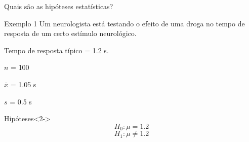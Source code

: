 \documentclass{beamer}
\begin{document}
\begin{frame}{\scriptsize Quais são as hipóteses estatísticas?}
  \begin{exampleblock}{Exemplo 1}
    \tiny
    Um neurologista está testando o efeito de uma droga no tempo de
    resposta de um certo estímulo neurológico.

    \smallskip
    Tempo de resposta típico = \alert{1.2 s}.

    \smallskip
    $n$ = \alert{100}

    $\bar{x}$ = \alert{1.05 s}

    $s$ = \alert{0.5 s}
  \end{exampleblock}
  \begin{exampleblock}{Hipóteses}<2->
    \begin{displaymath}
      H_0: \mu=1.2
    \end{displaymath}
    \begin{displaymath}
      H_1: \mu \ne 1.2
    \end{displaymath}
  \end{exampleblock}
\end{frame}


\end{document}
